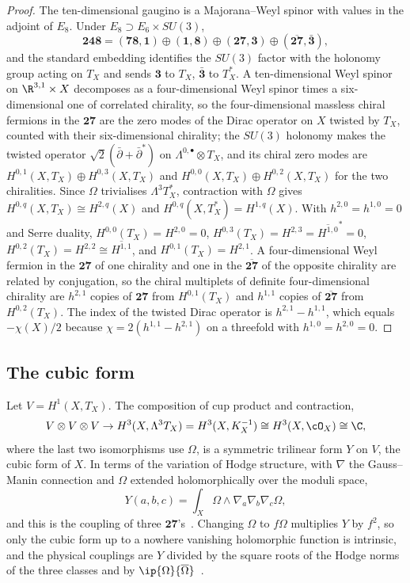 \begin{proof}
The ten-dimensional gaugino is a Majorana--Weyl spinor with values in the
adjoint of $E_8$. Under $E_8\supset E_6\times SU(3)$,
\[
\mathbf{248}=(\mathbf{78},\mathbf1)\oplus(\mathbf1,\mathbf8)\oplus
(\mathbf{27},\mathbf3)\oplus(\overline{\mathbf{27}},\bar{\mathbf3}),
\]
and the standard embedding identifies the $SU(3)$ factor with the holonomy
group acting on $T_X$ and sends $\mathbf3$ to $T_X$, $\bar{\mathbf3}$ to
$T_X^*$. A ten-dimensional Weyl spinor on $\R^{3,1}\times X$ decomposes as
a four-dimensional Weyl spinor times a six-dimensional one of correlated
chirality, so the four-dimensional massless chiral fermions in the
$\mathbf{27}$ are the zero modes of the Dirac operator on $X$ twisted by
$T_X$, counted with their six-dimensional chirality; the $SU(3)$ holonomy
makes the twisted operator $\sqrt2(\bar\partial+\bar\partial^*)$ on
$\Lambda^{0,\bullet}\otimes T_X$, and its chiral zero modes are
$H^{0,1}(X,T_X)\oplus H^{0,3}(X,T_X)$ and $H^{0,0}(X,T_X)\oplus
H^{0,2}(X,T_X)$ for the two chiralities. Since $\Omega$ trivialises
$\Lambda^3T_X^*$, contraction with $\Omega$ gives $H^{0,q}(X,T_X)\cong
H^{2,q}(X)$ and $H^{0,q}(X,T_X^*)=H^{1,q}(X)$. With $h^{2,0}=h^{1,0}=0$
and Serre duality, $H^{0,0}(T_X)=H^{2,0}=0$, $H^{0,3}(T_X)=
H^{2,3}=\overline{H^{1,0}}^*=0$, $H^{0,2}(T_X)=H^{2,2}\cong
\overline{H^{1,1}}$, and $H^{0,1}(T_X)=H^{2,1}$. A four-dimensional Weyl
fermion in the $\mathbf{27}$ of one chirality and one in the
$\overline{\mathbf{27}}$ of the opposite chirality are related by
conjugation, so the chiral multiplets of definite four-dimensional
chirality are $h^{2,1}$ copies of $\mathbf{27}$ from $H^{0,1}(T_X)$ and
$h^{1,1}$ copies of $\overline{\mathbf{27}}$ from $H^{0,2}(T_X)$. The index
of the twisted Dirac operator is $h^{2,1}-h^{1,1}$, which equals $-\chi(X)/2$
because $\chi=2(h^{1,1}-h^{2,1})$ on a threefold with $h^{1,0}=h^{2,0}=0$.
\end{proof}

\subsection{The cubic form}

Let $V=H^1(X,T_X)$. The composition of cup product and contraction,
\[
V\otimes V\otimes V\to H^3(X,\Lambda^3T_X)=H^3(X,K_X^{-1})\cong
H^3(X,\cO_X)\cong\C,
\]
where the last two isomorphisms use $\Omega$, is a symmetric trilinear form
$Y$ on $V$, the cubic form of $X$. In terms of the variation of Hodge
structure, with $\nabla$ the Gauss--Manin connection and $\Omega$ extended
holomorphically over the moduli space,
\begin{equation}\label{eq:yukawa}
Y(a,b,c)=\int_X\Omega\wedge\nabla_a\nabla_b\nabla_c\Omega,
\end{equation}
and this is the coupling of three $\mathbf{27}$'s~\cite{Str85}. Changing
$\Omega$ to $f\Omega$ multiplies $Y$ by $f^2$, so only the cubic form up to
a nowhere vanishing holomorphic function is intrinsic, and the physical
couplings are $Y$ divided by the square roots of the Hodge norms of the three
classes and by $\ip{\Omega}{\overline\Omega}$~\cite{DKL90,CdlO91}.


